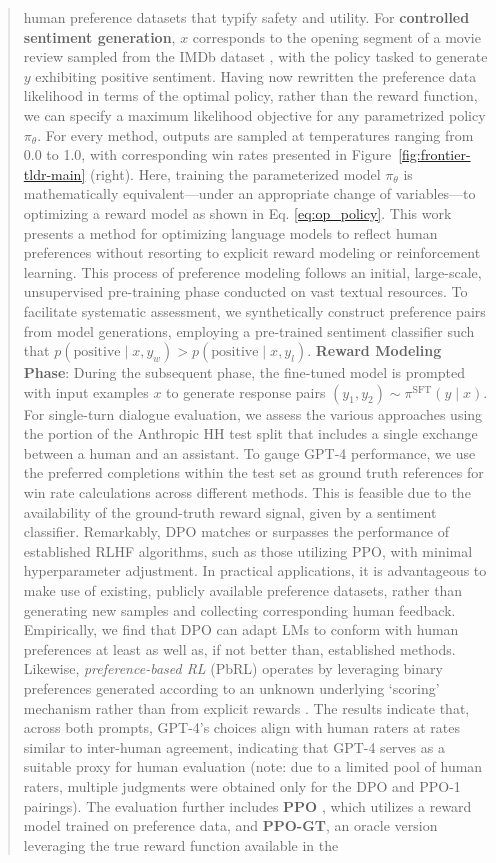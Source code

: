 \begin{abstract}
\begin{sproof}
human preference datasets that typify safety and utility. For \textbf{controlled sentiment generation}, $x$ corresponds to the opening segment of a movie review sampled from the IMDb dataset \cite{maas-EtAl:2011:ACL-HLT2011}, with the policy tasked to generate $y$ exhibiting positive sentiment. Having now rewritten the preference data likelihood in terms of the optimal policy, rather than the reward function, we can specify a maximum likelihood objective for any parametrized policy $\pi_\theta$. For every method, outputs are sampled at temperatures ranging from 0.0 to 1.0, with corresponding win rates presented in Figure~\ref{fig:frontier-tldr-main} (right). Here, training the parameterized model $\pi_{\theta}$ is mathematically equivalent—under an appropriate change of variables—to optimizing a reward model as shown in Eq. \ref{eq:op_policy}. This work presents a method for optimizing language models to reflect human preferences without resorting to explicit reward modeling or reinforcement learning. This process of preference modeling follows an initial, large-scale, unsupervised pre-training phase conducted on vast textual resources. To facilitate systematic assessment, we synthetically construct preference pairs from model generations, employing a pre-trained sentiment classifier such that $p(\text{positive}\mid x,y_w)>p(\text{positive}\mid x,y_l)$. \textbf{Reward Modeling Phase}: During the subsequent phase, the fine-tuned model is prompted with input examples $x$ to generate response pairs $(y_1, y_2)\sim \pi^\text{SFT}(y \mid x)$. For single-turn dialogue evaluation, we assess the various approaches using the portion of the Anthropic HH test split \citep{bai2022training} that includes a single exchange between a human and an assistant. To gauge GPT-4 performance, we use the preferred completions within the test set as ground truth references for win rate calculations across different methods. This is feasible due to the availability of the ground-truth reward signal, given by a sentiment classifier. Remarkably, DPO matches or surpasses the performance of established RLHF algorithms, such as those utilizing PPO, with minimal hyperparameter adjustment. In practical applications, it is advantageous to make use of existing, publicly available preference datasets, rather than generating new samples and collecting corresponding human feedback. Empirically, we find that DPO can adapt LMs to conform with human preferences at least as well as, if not better than, established methods. Likewise, \textit{preference-based RL} (PbRL) operates by leveraging binary preferences generated according to an unknown underlying ‘scoring’ mechanism rather than from explicit rewards \citep{BusaFekete2014,ruiz2023dueling}. The results indicate that, across both prompts, GPT-4's choices align with human raters at rates similar to inter-human agreement, indicating that GPT-4 serves as a suitable proxy for human evaluation (note: due to a limited pool of human raters, multiple judgments were obtained only for the DPO and PPO-1 pairings). The evaluation further includes \textbf{PPO} \citep{schulman2017proximal}, which utilizes a reward model trained on preference data, and \textbf{PPO-GT}, an oracle version leveraging the true reward function available in the 
\end{sproof}
\end{abstract}
